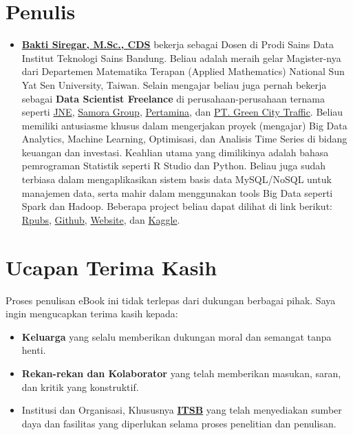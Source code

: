 \documentclass[
]{book}
\providecommand{\tightlist}{%
  \setlength{\itemsep}{0pt}\setlength{\parskip}{0pt}}
\begin{document}
\section*{Penulis}\label{penulis}

\begin{itemize}
\tightlist
\item
  \textbf{\href{https://www.linkedin.com/in/dsciencelabs/}{Bakti Siregar, M.Sc., CDS}} bekerja sebagai Dosen di Prodi Sains Data Institut Teknologi Sains Bandung. Beliau adalah meraih gelar Magister-nya dari Departemen Matematika Terapan (Applied Mathematics) National Sun Yat Sen University, Taiwan. Selain mengajar beliau juga pernah bekerja sebagai \textbf{Data Scientist Freelance} di perusahaan-perusahaan ternama seperti \href{https://www.jne.co.id/id/beranda}{JNE}, \href{https://www.samoragroup.co.id/home/en}{Samora Group}, \href{https://www.pertamina.com/}{Pertamina}, dan \href{https://ecgoevmoto.com/}{PT. Green City Traffic}. Beliau memiliki antusiasme khusus dalam mengerjakan proyek (mengajar) Big Data Analytics, Machine Learning, Optimisasi, dan Analisis Time Series di bidang keuangan dan investasi. Keahlian utama yang dimilikinya adalah bahasa pemrograman Statistik seperti R Studio dan Python. Beliau juga sudah terbiasa dalam mengaplikasikan sistem basis data MySQL/NoSQL untuk manajemen data, serta mahir dalam menggunakan tools Big Data seperti Spark dan Hadoop. Beberapa project beliau dapat dilihat di link berikut: \href{https://rpubs.com/dsciencelabs}{Rpubs}, \href{https://github.com/dsciencelabs}{Github}, \href{https://dsciencelabs.github.io/web/index.html}{Website}, dan \href{https://www.kaggle.com/baktisiregar/code}{Kaggle}.
\end{itemize}

\section*{Ucapan Terima Kasih}\label{ucapan-terima-kasih}

Proses penulisan eBook ini tidak terlepas dari dukungan berbagai pihak. Saya ingin mengucapkan terima kasih kepada:

\begin{itemize}
\tightlist
\item
  \textbf{Keluarga} yang selalu memberikan dukungan moral dan semangat tanpa henti.
\item
  \textbf{Rekan-rekan dan Kolaborator} yang telah memberikan masukan, saran, dan kritik yang konstruktif.
\item
  Institusi dan Organisasi, Khususnya \textbf{\href{https://itsb.ac.id/}{ITSB}} yang telah menyediakan sumber daya dan fasilitas yang diperlukan selama proses penelitian dan penulisan.
\end{itemize}
\end{document}
